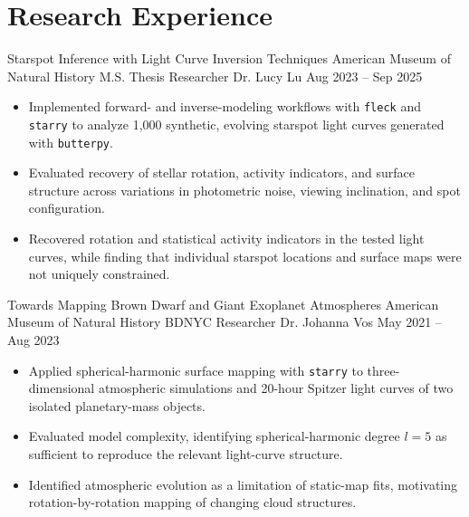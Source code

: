 
\section{Research Experience}

\researchentry
  {Starspot Inference with Light Curve Inversion Techniques}
  {American Museum of Natural History}
  {M.S. Thesis Researcher}
  {Dr. Lucy Lu}
  {Aug 2023 -- Sep 2025}
  {}
\begin{itemize}[
  leftmargin=1em,
  label={--},
  itemsep=3pt,
  topsep=0pt,
  parsep=0pt,
  partopsep=0pt
]
  \item Implemented forward- and inverse-modeling workflows with
  \texttt{fleck} and \texttt{starry} to analyze 1,000 synthetic, evolving
  starspot light curves generated with \texttt{butterpy}.

  \item Evaluated recovery of stellar rotation, activity indicators, and
  surface structure across variations in photometric noise, viewing
  inclination, and spot configuration.

  \item Recovered rotation and statistical activity indicators in the tested
  light curves, while finding that individual starspot locations and surface
  maps were not uniquely constrained.
\end{itemize}

\vspace{0.4em}

\researchentry
  {Towards Mapping Brown Dwarf and Giant Exoplanet Atmospheres}
  {American Museum of Natural History}
  {BDNYC Researcher}
  {Dr. Johanna Vos}
  {May 2021 -- Aug 2023}
  {}

\begin{itemize}[
  leftmargin=1em,
  label={--},
  itemsep=3pt,
  topsep=0pt,
  parsep=0pt,
  partopsep=0pt
]

\item Applied spherical-harmonic surface mapping with \texttt{starry} to
three-dimensional atmospheric simulations and 20-hour Spitzer light curves
of two isolated planetary-mass objects.

\item Evaluated model complexity, identifying spherical-harmonic degree
$l=5$ as sufficient to reproduce the relevant light-curve structure.

\item Identified atmospheric evolution as a limitation of static-map fits,
motivating rotation-by-rotation mapping of changing cloud structures.

\end{itemize}

